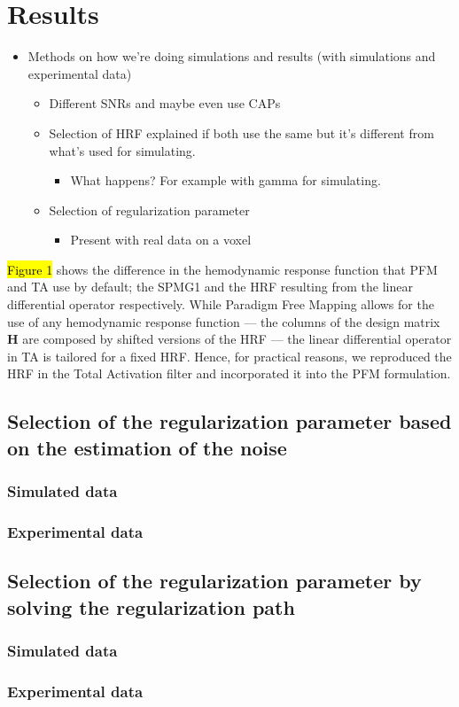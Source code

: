 \section{Results}

\begin{itemize}
    \item Methods on how we're doing simulations and results (with simulations and experimental data)
    \begin{itemize}
        \item Different SNRs and maybe even use CAPs
        \item Selection of HRF explained if both use the same but it's different from what's used for simulating.
        \begin{itemize}
            \item What happens? For example with gamma for simulating.
        \end{itemize}
        \item Selection of regularization parameter
        \begin{itemize}
            \item Present with real data on a voxel
        \end{itemize}
    \end{itemize}
\end{itemize}

\hl{Figure 1} shows the difference in the hemodynamic response function that PFM and TA use by default; the SPMG1 and the HRF resulting from the linear differential operator respectively. While Paradigm Free Mapping allows for the use of any hemodynamic response function --- the columns of the design matrix \(\mathbf{H}\) are composed by shifted versions of the HRF --- the linear differential operator in TA is tailored for a fixed HRF. Hence, for practical reasons, we reproduced the HRF in the Total Activation filter and incorporated it into the PFM formulation.

\subsection{Selection of the regularization parameter based on the estimation of the noise}

\subsubsection{Simulated data}

\subsubsection{Experimental data}

\subsection{Selection of the regularization parameter by solving the regularization path}

\subsubsection{Simulated data}

\subsubsection{Experimental data}